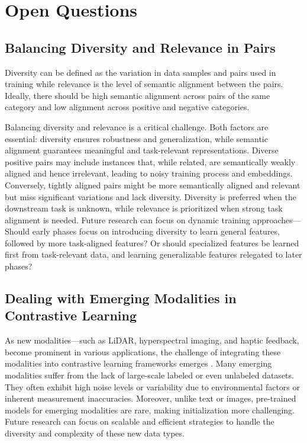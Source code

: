 \section{Open Questions}

\subsection{Balancing Diversity and Relevance in Pairs}
Diversity can be defined as the variation in data samples and pairs used in training while relevance is the level of semantic alignment between the pairs. Ideally, there should be high semantic alignment across pairs of the same category and low alignment across positive and negative categories.

Balancing diversity and relevance is a critical challenge. Both factors are essential: diversity ensures robustness and generalization, while semantic alignment guarantees meaningful and task-relevant representations. Diverse positive pairs may include instances that, while related, are semantically weakly aligned and hence irrelevant, leading to noisy training process and embeddings. Conversely, tightly aligned pairs might be more semantically aligned and relevant but miss significant variations and lack diversity.
Diversity is preferred when the downstream task is unknown, while relevance is prioritized when strong task alignment is needed. 
Future research can focus on dynamic training approaches---
Should early phases focus on introducing diversity to learn general features, followed by more task-aligned features? Or should specialized features be learned first from task-relevant data, and learning generalizable features relegated to later phases?

\subsection{Dealing with Emerging Modalities in Contrastive Learning}

As new modalities—such as LiDAR, hyperspectral imaging, and haptic feedback, become prominent in various applications, the challenge of integrating these modalities into contrastive learning frameworks emerges \cite{dai2024advancing}. 
Many emerging modalities suffer from the lack of large-scale labeled or even unlabeled datasets. They often exhibit high noise levels or variability due to environmental factors or inherent measurement inaccuracies. Moreover, unlike text or images, pre-trained models for emerging modalities are rare, making initialization more challenging. Future research can focus on scalable and efficient strategies to handle the diversity and complexity of these new data types.

